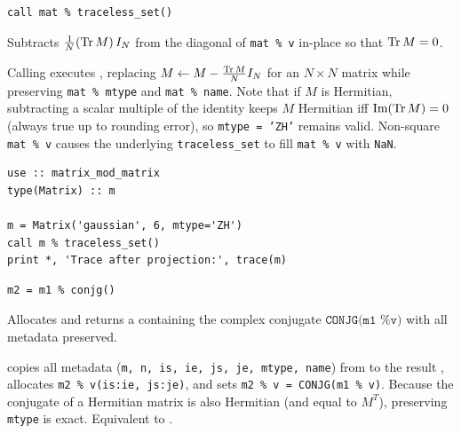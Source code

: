 \lstset{language=[95]Fortran}
\begin{lstlisting}
call mat % traceless_set()
\end{lstlisting}

Subtracts $\frac{1}{N}({\rm Tr\,} M)\, I_N$ from the diagonal of \texttt{mat \% v} in-place so that ${\rm Tr\,} M = 0$.

Calling  executes , replacing $M \leftarrow M - \frac{{\rm Tr\,} M}{N} I_N$ for an $N\times N$ matrix while preserving \texttt{mat \% mtype} and \texttt{mat \% name}. Note that if $M$ is Hermitian, subtracting a scalar multiple of the identity keeps $M$ Hermitian iff $\mbox{Im}({\rm Tr\,} M)=0$ (always true up to rounding error), so \texttt{mtype = 'ZH'} remains valid. Non-square \texttt{mat \% v} causes the underlying \texttt{traceless\_set} to fill \texttt{mat \% v} with \texttt{NaN}.

\begin{description}[leftmargin=2.2cm, style=nextline]
\end{description}

\lstset{language=[95]Fortran}
\begin{lstlisting}
use :: matrix_mod_matrix
type(Matrix) :: m

m = Matrix('gaussian', 6, mtype='ZH')
call m % traceless_set()
print *, 'Trace after projection:', trace(m)
\end{lstlisting}


\lstset{language=[95]Fortran}
\begin{lstlisting}
m2 = m1 % conjg()
\end{lstlisting}

Allocates and returns a  containing the complex conjugate $\texttt{CONJG(m1 \% v)}$ with all metadata preserved.

 copies all metadata (\texttt{m, n, is, ie, js, je, mtype, name}) from  to the result , allocates \texttt{m2 \% v(is:ie, js:je)}, and sets \texttt{m2 \% v = CONJG(m1 \% v)}. Because the conjugate of a Hermitian matrix is also Hermitian (and equal to $M^T$), preserving \texttt{mtype} is exact. Equivalent to .

